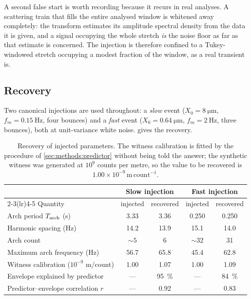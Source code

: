 A second false start is worth recording because it recurs in real analyses. A
scattering train that fills the entire analysed window is whitened away
completely: the transform estimates its amplitude spectral density from the
data it is given, and a signal occupying the whole stretch \emph{is} the noise
floor as far as that estimate is concerned. The injection is therefore
confined to a Tukey-windowed stretch occupying a modest fraction of the
window, as a real transient is.

\subsection{Recovery}

Two canonical injections are used throughout: a \emph{slow} event
($X_0 = \SI{8}{\micro\metre}$, $f_m = \SI{0.15}{\hertz}$, four bounces) and a
\emph{fast} event ($X_0 = \SI{0.64}{\micro\metre}$, $f_m = \SI{2}{\hertz}$,
three bounces), both at unit-variance white noise.  gives
the recovery.

\begin{table}[htbp]
\centering
\caption{Recovery of injected parameters. The witness calibration is fitted by
the procedure of \cref{sec:methods:predictor} without being told the answer;
the synthetic witness was generated at $10^{9}$ counts per metre, so the value
to be recovered is $1.00\times10^{-9}\,\mathrm{m}\,\mathrm{count}^{-1}$.}
\label{tab:validation}
\small
\begin{tabular}{lcccc}
\toprule
& \multicolumn{2}{c}{Slow injection} & \multicolumn{2}{c}{Fast injection} \\
\cmidrule(lr){2-3}\cmidrule(lr){4-5}
Quantity & injected & recovered & injected & recovered \\
\midrule
Arch period $T_{\mathrm{arch}}$ (\si{\second})   & 3.33 & 3.36 & 0.250 & 0.250 \\
Harmonic spacing (\si{\hertz})        & 14.2 & 13.9 & 15.1  & 14.0 \\
Arch count                            & $\sim5$ & 6 & $\sim32$ & 31 \\
Maximum arch frequency (\si{\hertz})  & 56.7 & 65.8 & 45.4 & 62.8 \\
Witness calibration ($10^{-9}$ m/count) & 1.00 & 1.07 & 1.00 & 1.09 \\
Envelope explained by predictor       & --- & \SI{95}{\percent} & --- & \SI{84}{\percent} \\
Predictor--envelope correlation $r$   & --- & 0.92 & --- & 0.83 \\
\bottomrule
\end{tabular}
\end{table}

